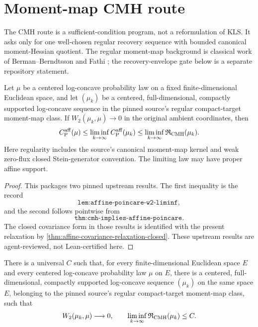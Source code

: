 \section{Moment-map CMH route}
\label{route:moment-map-cmh}

The CMH route is a sufficient-condition program, not a reformulation of KLS.  It asks only for one
well-chosen regular recovery sequence with bounded canonical moment-Hessian quotient.  The regular
moment-map background is classical work of Berman--Berndtsson and Fathi
\cite{BermanBerndtsson2013RealMA,Fathi2019SteinMomentMaps}; the recovery-envelope gate below is a
separate repository statement.

\begin{theorem}
  \label{thm:cmh-recovery-affine-poincare-bound}
  Let $\mu$ be a centered log-concave probability law on a fixed finite-dimensional Euclidean
  space, and let $(\mu_k)$ be a centered, full-dimensional, compactly supported log-concave
  sequence in the pinned source's regular compact-target moment-map class.  If
  $W_2(\mu_k,\mu)\to0$ in the original ambient coordinates, then
  \[
    C_{\mathrm P}^{\mathrm{aff}}(\mu)
      \le \liminf_{k\to\infty}C_{\mathrm P}^{\mathrm{aff}}(\mu_k)
      \le \liminf_{k\to\infty}\mathfrak R_{\mathrm{CMH}}(\mu_k).
  \]
  Here regularity includes the source's canonical moment-map kernel and weak zero-flux closed
  Stein-generator convention.  The limiting law may have proper affine support.
\end{theorem}
\begin{proof}
  This packages two pinned upstream results.  The first inequality is the record
  \[
    \texttt{lem:affine-poincare-w2-liminf},
  \]
  and the second follows pointwise from
  \[
    \texttt{thm:cmh-implies-affine-poincare}.
  \]
  The closed covariance form in those results is identified with the present relaxation by
  \cref{thm:affine-covariance-relaxation-closed}.  These upstream results are agent-reviewed, not
  Lean-certified here.
\end{proof}

\begin{assumption}
  \label{ass:cmh-recovery-envelope}
  There is a universal $C$ such that, for every finite-dimensional Euclidean space $E$ and every
  centered log-concave probability law $\mu$ on $E$, there is a centered, full-dimensional,
  compactly supported log-concave sequence $(\mu_k)$ on the same space $E$, belonging to the
  pinned source's regular compact-target moment-map class, such that
  \[
    W_2(\mu_k,\mu)\longrightarrow0,
    \qquad
    \liminf_{k\to\infty}\mathfrak R_{\mathrm{CMH}}(\mu_k)\le C.
  \]
\end{assumption}

